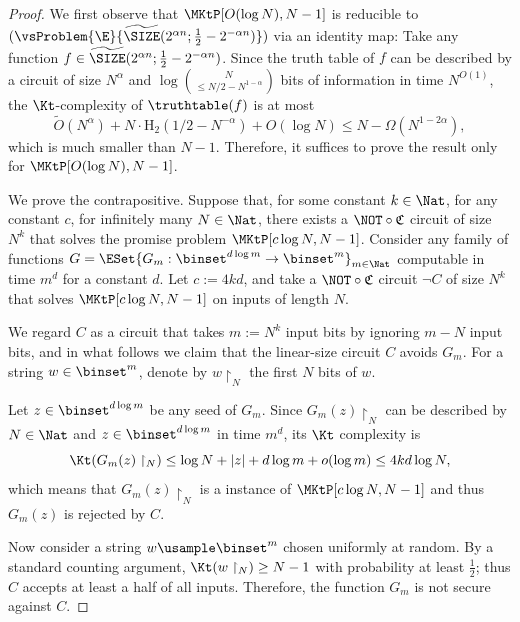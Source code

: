 \documentclass[11pt]{article}
\numberwithin{equation}{section}
\theoremstyle{definition}
\theoremstyle{plain}
\begin{document}
\begin{proof}
  We first observe that
  $\MKtP[O(\log N), N - 1]$
  is reducible to
  $(\vsProblem{\E}{\widetilde{\SIZE}(2^{\alpha n}; \frac{1}{2} - 2^{- \alpha n})})$
  via an identity map:
  Take any function $f \in \widetilde{\SIZE}({2^{\alpha n}; \frac{1}{2} - 2^{- \alpha n}})$.
  Since the truth table of $f$ can be described by a circuit of size $N^\alpha$ and $\log \binom{N}{\le N/2 - N^{1 - \alpha}}$ bits of information
  in time $N^{O(1)}$,
  the $\Kt$-complexity of $\truthtable(f)$ is at most
  $$
    \widetilde{O}(N^\alpha) + N \cdot \mathrm{H}_2(1 / 2 - N^{-\alpha}) + O(\log N) \le N - \Omega(N^{1 - 2 \alpha}),
  $$
  which is much smaller than $N - 1$.
  Therefore, it suffices to prove the result only for $\MKtP[O(\log N), N - 1]$.

  We prove the contrapositive.
  Suppose that, for some constant $k \in \Nat$,
  for any constant $c$,
  for infinitely many $N \in \Nat$,
  there exists a $\NOT \circ \mathfrak{C}$ circuit of size $N^{k}$ that solves
  the promise problem $\MKtP[c \log N, N - 1]$.
  Consider any family of functions $G = \ESet{ G_m : \binset^{d \log m} \to \binset^m }_{m \in \Nat} $ computable in time $m^{d}$ for a constant $d$.
  Let $c := 4 k d$, and take a $\NOT \circ \mathfrak{C}$ circuit $\neg C$
  of size $N^k$ that solves $\MKtP[c \log N, N - 1]$ on inputs of length $N$.

  We regard $C$ as a circuit that takes $m := N^k$ input bits by ignoring $m - N$ input bits,
  and in what follows we claim that the linear-size circuit $C$ avoids $G_m$.
  For a string $w \in \binset^m$, denote by $w \restriction_N$ the first $N$ bits of $w$.

  Let $z \in \binset^{d \log m}$ be any seed of $G_m$.
  Since $G_m(z) \restriction_N$ can be described by $N \in \Nat$ and $z \in \binset^{d \log m}$ in time $m^d$,
  its $\Kt$ complexity is
  $$
    \Kt(G_m(z) \restriction_N) \le \log N + |z| + d \log m + o(\log m) \le 4 k d \log N,
  $$
  which means that $G_m(z) \restriction_N$ is a \Yes instance of $\MKtP[c \log N, N - 1]$ and thus $G_m(z)$ is rejected by $C$.

  Now consider a string $w \usample \binset^m$ chosen uniformly at random.
  By a standard counting argument, $\Kt(w \restriction_N) \ge N - 1$ with probability at least $\frac{1}{2}$;
  thus $C$ accepts at least a half of all inputs.
  Therefore, the function $G_m$ is not secure against $C$.
\end{proof}
\end{document}
